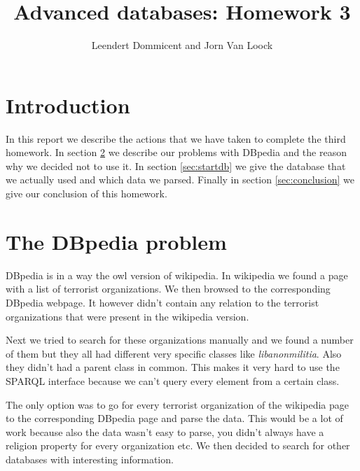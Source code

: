 \documentclass{article}
\title{Advanced databases: Homework 3}
\author{Leendert Dommicent and Jorn Van Loock}
\begin{document}
\maketitle
\section{Introduction}
In this report we describe the actions that we have taken to complete the third homework. In section \ref{sec:dbpedia} we describe our problems with DBpedia and the reason why we decided not to use it. In section \ref{sec:startdb} we give the database that we actually used and which data we parsed. Finally in section \ref{sec:conclusion} we give our conclusion of this homework.
\section{The DBpedia problem}
\label{sec:dbpedia}
DBpedia\cite{dbpedia} is in a way the owl version of wikipedia. In wikipedia we found a page with a list of terrorist organizations. We then browsed to the corresponding DBpedia webpage. It however didn't contain any relation to the terrorist organizations that were present in the wikipedia version.\par
Next we tried to search for these organizations manually and we found a number of them but they all had different very specific classes like \textit{libanonmilitia}. Also they didn't had a parent class in common. This makes it very hard to use the SPARQL interface because we can't query every element from a certain class.\par
The only option was to go for every terrorist organization of the wikipedia page to the corresponding DBpedia page and parse the data. This would be a lot of work because also the data wasn't easy to parse, you didn't always have a religion property for every organization etc. We then decided to search for other databases with interesting information.
\end{document}
